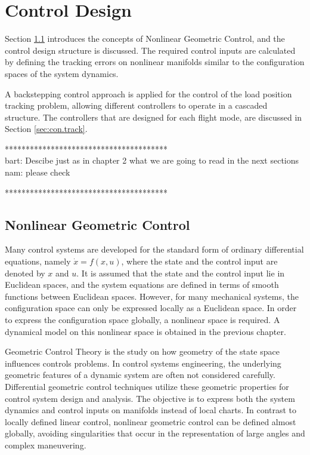 \chapter{Control Design} \label{ch:control}
Section \ref{sec:con.nlgc} introduces the concepts of Nonlinear Geometric Control, and the control design structure is discussed. 
The required control inputs are calculated by defining the tracking errors on nonlinear manifolds similar to the configuration spaces of the system dynamics.

A backstepping control approach is applied for the control of the load position tracking problem, allowing different controllers to operate in a cascaded structure. The controllers that are designed for each flight mode, are discussed in Section \ref{sec:con.track}. 


***************************************\\
bart: Descibe just as in chapter 2 what we are going to read in the next sections\\
nam: please check

***************************************\\

\section{Nonlinear Geometric Control}\label{sec:con.nlgc}
Many control systems are developed for the standard form of ordinary differential equations, namely $ \dot{x}=f(x,u) $, where the state and the control input are denoted by $ x $ and $ u $. It is assumed that the state and the control input lie in Euclidean spaces, and the system equations are defined in terms of smooth functions between Euclidean spaces. However, for many mechanical systems, the configuration space can only be expressed locally as a Euclidean space. In order to express the configuration space globally, a nonlinear space is required. A dynamical model on this nonlinear space is obtained in the previous chapter.

Geometric Control Theory is the study on how geometry of the state space influences controls problems. 
In control systems engineering, the underlying geometric features of a dynamic system are often not considered carefully. 
Differential geometric control techniques utilize these geometric properties for control system design and analysis.
The objective is to express both the system dynamics and control inputs on manifolds instead of local charts. 
In contrast to locally defined linear control, nonlinear geometric control can be defined almost globally, avoiding singularities that occur in the representation of large angles and complex maneuvering.

